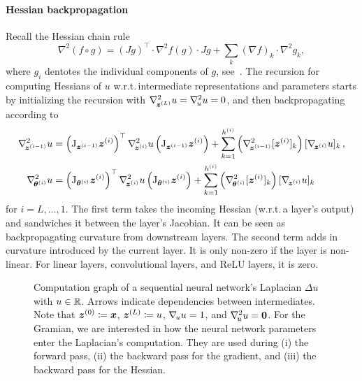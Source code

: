\paragraph{Hessian backpropagation}
Recall the Hessian chain rule
\begin{equation}\label{eq:hessianChainRule}
  \nabla^2 (f\circ g) = (J g)^\top\cdot \nabla^2 f(g) \cdot Jg + \sum_{k} (\nabla f)_k \cdot \nabla^2 g_k,
\end{equation}
where $g_i$ dentotes the individual components of $g$, see~\cite{skorski2019chain}.
The recursion for computing Hessians of $u$
w.r.t.\,intermediate representations and parameters starts by initializing the
recursion with $\nabla_{\!{{\bm{z}}^{(L)}}}^{2}u = \nabla_{\!{u}}^{2} u = 0$, and then
backpropagating according to
\begin{align}\label{eq:hessian-backpropagation}
  \begin{split}
    \gradsquared{\vz^{(i-1)}}u
    &=
      \left( \jac_{\vz^{(i-1)}} \vz^{(i)} \right)^{\top}
      \gradsquared{\vz^{(i)}}u
      \left( \jac_{\vz^{(i-1)}} \vz^{(i)} \right)
      +
      \sum_{k=1}^{h^{(i)}}
      \left(
      \gradsquared{\vz^{(i-1)}} [\vz^{(i)}]_k
      \right)
      [\grad{\vz^{(i)}} u]_k\,,
    \\
    \gradsquared{\vtheta^{(i)}}u
    &=
      \left( \jac_{\vtheta^{(i)}} \vz^{(i)} \right)^{\top}
      \gradsquared{\vz^{(i)}}u
      \left( \jac_{\vtheta^{(i)}} \vz^{(i)} \right)
      +
      \sum_{k=1}^{h^{(i)}}
      \left(
      \gradsquared{\vtheta^{(i)}} [\vz^{(i)}]_k
      \right)
      [\grad{\vz^{(i)}} u]_k
  \end{split}
\end{align}
for $i = L, \dots, 1$.
The first term takes the incoming Hessian (w.r.t.\,a layer's output) and sandwiches it between the layer's Jacobian.
It can be seen as backpropagating curvature from downstream layers.
The second term adds in curvature introduced by the current layer.
It is only non-zero if the layer is non-linear.
For linear layers, convolutional layers, and ReLU layers, it is zero.

\begin{figure}[t]
  \centering
  \resizebox{\linewidth}{!}{%
    
  }
  \caption{Computation graph of a sequential neural network's Laplacian $\Delta u$ with $u \in {\mathbb{R}}$.
    Arrows indicate dependencies between intermediates.
    Note that ${\bm{z}}^{(0)} \coloneqq {\bm{x}}$, ${\bm{z}}^{(L)} \coloneqq u$, $\nabla_{\!{u}}u = 1$, and $\nabla_{\!{u}}^{2}u = {\bm{0}}$.
    For the Gramian, we are interested in how the neural network parameters enter the Laplacian's computation.
    They are used during (i) the forward pass, (ii) the backward pass for the gradient, and (iii) the backward pass for the Hessian.}\label{fig:hbp-dependencies}
\end{figure}

